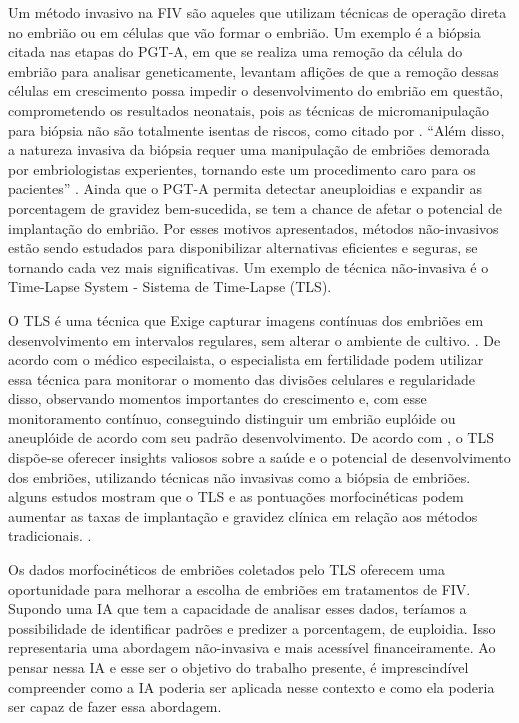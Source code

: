 Um método invasivo na FIV são aqueles que utilizam técnicas de operação direta no embrião ou em células que vão formar o embrião. Um exemplo é a biópsia citada nas etapas do PGT-A, em que se realiza uma remoção da célula do embrião para analisar geneticamente,  levantam aflições de que a remoção dessas células em crescimento possa impedir o desenvolvimento do embrião em questão, comprometendo os resultados neonatais, pois as técnicas de micromanipulação para biópsia não são totalmente isentas de riscos, como citado por . “Além disso, a natureza invasiva da biópsia requer uma manipulação de embriões demorada por embriologistas experientes, tornando este um procedimento caro para os pacientes” \cite{phillips2024, leaver2019}. Ainda que o PGT-A permita detectar aneuploidias e expandir as porcentagem de gravidez bem-sucedida, se tem a chance de afetar o potencial de implantação do embrião. Por esses motivos apresentados, métodos não-invasivos estão sendo estudados para disponibilizar alternativas eficientes e seguras, se tornando cada vez mais significativas. Um exemplo de técnica não-invasiva é o Time-Lapse System {-} Sistema de Time-Lapse (TLS).

O TLS é uma técnica que Exige capturar imagens contínuas dos embriões em desenvolvimento em intervalos regulares, sem alterar o ambiente de cultivo. \cite{moustakli2024}. De acordo com o médico especilaista, o especialista em fertilidade podem utilizar essa técnica para monitorar o momento das divisões celulares e regularidade disso, observando momentos importantes do crescimento e, com esse monitoramento contínuo, conseguindo distinguir um embrião euplóide ou aneuplóide de acordo com seu padrão desenvolvimento. De acordo com , o TLS dispõe-se oferecer insights valiosos sobre a saúde e o potencial de desenvolvimento dos embriões, utilizando técnicas não invasivas como a biópsia de embriões. alguns estudos mostram que o TLS e as pontuações morfocinéticas podem aumentar as taxas de implantação e gravidez clínica em relação aos métodos tradicionais. \cite{boucret2021}.

Os dados morfocinéticos de embriões coletados pelo TLS oferecem uma oportunidade para melhorar a escolha de embriões em tratamentos de FIV. Supondo uma IA que tem a capacidade de analisar esses dados, teríamos a possibilidade de identificar padrões e predizer a porcentagem, de euploidia. Isso representaria uma abordagem não-invasiva e mais acessível financeiramente. Ao pensar nessa IA e esse ser o objetivo do trabalho presente, é imprescindível compreender como a IA poderia ser aplicada nesse contexto e como ela poderia ser capaz de fazer essa abordagem. 

